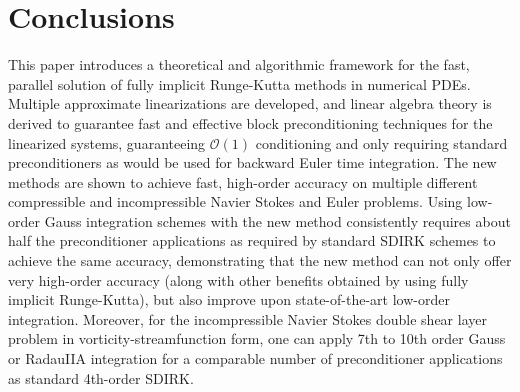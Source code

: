 \documentclass[review]{siamart}
\begin{document}
\section{Conclusions}\label{sec:conc}

This paper introduces a theoretical and algorithmic framework for the fast, parallel
solution of fully implicit Runge-Kutta methods in numerical PDEs. Multiple approximate
linearizations are developed, and linear algebra theory is derived to guarantee
fast and effective block preconditioning techniques for the linearized systems,
guaranteeing $\mathcal{O}(1)$ conditioning and only requiring standard preconditioners
as would be used for backward Euler time integration. The new methods are shown to achieve fast,
high-order accuracy on multiple different compressible and incompressible Navier
Stokes and Euler problems. Using low-order Gauss integration schemes
with the new method consistently requires about half the preconditioner applications as
required by standard SDIRK schemes to achieve the same accuracy, demonstrating that
the new method can not only offer very high-order accuracy (along with other benefits
obtained by using fully implicit Runge-Kutta), but also improve upon state-of-the-art
low-order integration. Moreover, for the incompressible Navier Stokes double shear
layer problem in vorticity-streamfunction form, one can apply 7th to 10th order Gauss
or RadauIIA integration for a comparable number of preconditioner applications as
standard 4th-order SDIRK.


\end{document}
